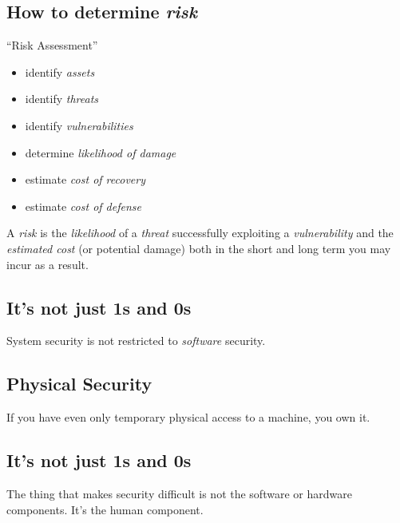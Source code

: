 \documentclass[xga]{xdvislides}
\begin{document}
\subsection{How to determine {\em risk}}
``Risk Assessment''
\begin{itemize}
	\item identify {\em assets}
	\item identify {\em threats}
	\item identify {\em vulnerabilities}
	\item determine {\em likelihood of damage}
	\item estimate {\em cost of recovery}
	\item estimate {\em cost of defense}
\end{itemize}
\vspace{.5in}

A {\em risk} is the {\em likelihood} of a {\em threat} successfully exploiting
a {\em vulnerability} and the {\em estimated cost} (or potential damage) both
in the short and long term you may incur as a result.

\subsection{It's not just 1s and 0s}
\vspace{.5in}
\Huge
\begin{center}
System security is not restricted to {\em software} security.
\end{center}
\Normalsize

\subsection{Physical Security}
\vspace{.5in}

\Huge
\begin{center}
If you have even only temporary physical access to a machine, you own it.
\end{center}
\Normalsize

\subsection{It's not just 1s and 0s}
\vspace{.5in}
\Huge
\begin{center}
The thing that makes security difficult is not the software or hardware
components.  It's the human component.
\end{center}
\Normalsize
\end{document}
